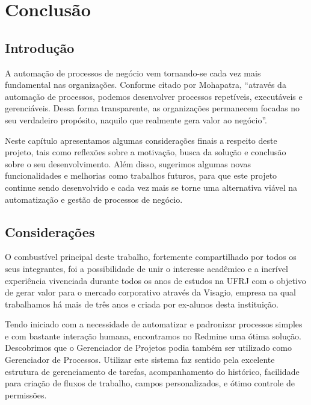 \chapter{Conclusão}\label{chp:conclusao}

\section{Introdução}\label{sec:conclusao-introducao}

A automação de processos de negócio vem tornando-se cada vez mais fundamental nas organizações. Conforme citado por Mohapatra\cite{bpa_mohapatra}, “através da automação de processos, podemos desenvolver processos repetíveis, executáveis e gerenciáveis. Dessa forma transparente, as organizações permanecem focadas no seu verdadeiro propósito, naquilo que realmente gera valor ao negócio”.

Neste capítulo apresentamos algumas considerações finais a respeito deste projeto, tais como reflexões sobre a motivação, busca da solução e conclusão sobre o seu desenvolvimento. Além disso, sugerimos algumas novas funcionalidades e melhorias como trabalhos futuros, para que este projeto continue sendo desenvolvido e cada vez mais se torne uma alternativa viável na automatização e gestão de processos de negócio.

\section{Considerações}\label{sec:conclusao-introducao}

O combustível principal deste trabalho, fortemente compartilhado por todos os seus integrantes, foi a possibilidade de unir o interesse acadêmico e a incrível experiência vivenciada durante todos os anos de estudos na UFRJ com o objetivo de gerar valor para o mercado corporativo através da Visagio\cite{visagio}, empresa na qual trabalhamos há mais de três anos e criada por ex-alunos desta instituição.

Tendo iniciado com a necessidade de automatizar e padronizar processos simples e com bastante interação humana, encontramos no Redmine uma ótima solução. Descobrimos que o Gerenciador de Projetos podia também ser utilizado como Gerenciador de Processos. Utilizar este sistema faz sentido pela excelente estrutura de gerenciamento de tarefas, acompanhamento do histórico, facilidade para criação de fluxos de trabalho, campos personalizados, e ótimo controle de permissões.

